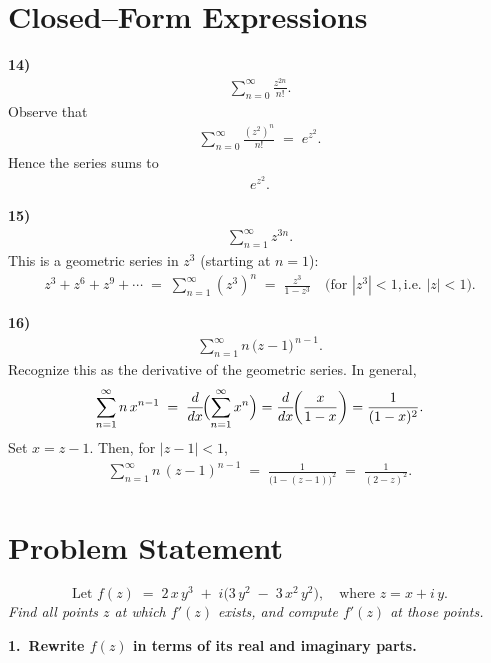 \documentclass[12pt]{article}
\theoremstyle{definition} %
\theoremstyle{plain} %
\begin{document}
\section*{Closed--Form Expressions}

\noindent
\textbf{14)} 
\begin{align}
\sum_{n=0}^{\infty} \frac{z^{2n}}{n!}.
\end{align}
Observe that 
\begin{align}
\sum_{n=0}^\infty \frac{(z^2)^n}{n!} 
\;=\;
e^{z^2}.
\end{align}
Hence the series sums to 
\begin{align}
e^{z^2}.
\end{align}

\medskip
\noindent
\textbf{15)} 
\begin{align}
\sum_{n=1}^{\infty} z^{3n}.
\end{align}
This is a geometric series in $z^3$ (starting at $n=1$):
\begin{align}
z^3 + z^6 + z^9 + \cdots 
\;=\;
\sum_{n=1}^\infty (z^3)^n 
\;=\;
\frac{z^3}{1 - z^3}
\quad
\bigl(\text{for }|z^3|<1, \text{i.e.\ }|z|<1\bigr).
\end{align}

\medskip
\noindent
\textbf{16)} 
\begin{align}
\sum_{n=1}^{\infty} n\,\bigl(z - 1\bigr)^{\,n-1}.
\end{align}
Recognize this as the derivative of the geometric series.  In general,
\begin{align}
\sum_{n=1}^\infty n\,x^{n-1}
\;=\;
\frac{d}{dx}\!\Bigl(\sum_{n=1}^\infty x^n\Bigr)
=
\frac{d}{dx}\!\biggl(\frac{x}{1 - x}\biggr)
=
\frac{1}{(1 - x)^2}.
\end{align}
Set $x = z-1$.  Then, for $|z-1|<1$,
\begin{align}
\sum_{n=1}^{\infty} n\,(z - 1)^{n-1}
\;=\;
\frac{1}{\bigl(1 - (z-1)\bigr)^2}
\;=\;
\frac{1}{(2 - z)^2}.
\end{align}

\section*{Problem Statement}
\[
\text{Let } f(z) \;=\; 2\,x\,y^{3} \;+\; i\bigl(3\,y^{2} \;-\; 3\,x^{2}\,y^{2}\bigr),
\quad \text{where } z = x + i\,y.
\]
\textit{Find all points $z$ at which $f'(z)$ exists, and compute $f'(z)$ at those points.}

\bigskip

\noindent
\textbf{1.\ Rewrite $f(z)$ in terms of its real and imaginary parts.}
\end{document}
